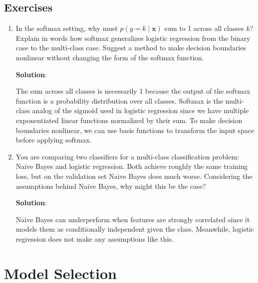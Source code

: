 \documentclass[11pt, letterpaper]{article}
\theoremstyle{definition}
\theoremstyle{plain}
\newenvironment{solution}{
    \vspace{2mm}
    \color{blue}\noindent\textbf{Solution}:
}{}
\begin{document}
\subsection{Exercises}
\begin{mdframed}
    \begin{enumerate}
        \item In the softmax setting, why must $p(y=k\mid \mathbf{x})$ sum to 1 across all classes $k$? Explain in words how softmax generalizes logistic regression from the binary case to the multi-class case. Suggest a method to make decision boundaries nonlinear without changing the form of the softmax function.
        
        \begin{solution}
            The sum across all classes is necessarily 1 because the output of the softmax function is a probability distribution over all classes. Softmax is the multi-class analog of the sigmoid used in logistic regression since we have multiple exponentiated linear functions normalized by their sum. To make decision boundaries nonlinear, we can use basis functions to transform the input space before applying softmax.
        \end{solution}

        \item You are comparing two classifiers for a multi-class classification problem: Naive Bayes and logistic regression. Both achieve roughly the same training loss, but on the validation set Naive Bayes does much worse. Considering the assumptions behind Naive Bayes, why might this be the case?
        
        \begin{solution}
            Naive Bayes can underperform when features are strongly correlated since it models them as conditionally independent given the class. Meanwhile, logistic regression does not make any assumptions like this.

        \end{solution}
    \end{enumerate}
\end{mdframed}


\section{Model Selection}
\end{document}
